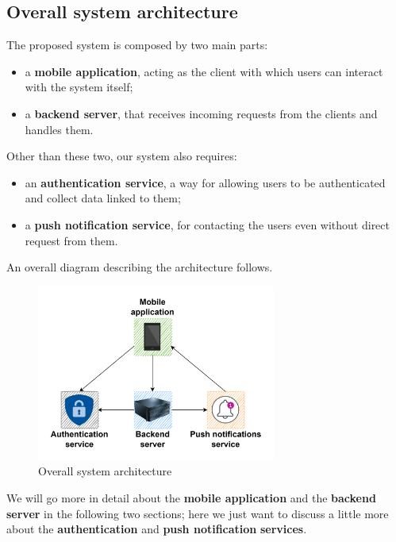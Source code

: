 \documentclass[../../main]{subfiles}
\begin{document}
\subsection{Overall system architecture}
\label{ss:overall-system-architecture}

The proposed system is composed by two main parts:
\begin{itemize}
    \item a \textbf{mobile application}, acting as the client with which users can interact with the system itself;
    \item a \textbf{backend server}, that receives incoming requests from the clients and handles them.
\end{itemize}
Other than these two, our system also requires:
\begin{itemize}
    \item an \textbf{authentication service}, a way for allowing users to be authenticated and collect data linked to them;
    \item a \textbf{push notification service}, for contacting the users even without direct request from them.
\end{itemize}
An overall diagram describing the architecture follows.
\begin{figure}[h]
    \centering
    \includegraphics[width=0.7\textwidth]{images/overall_system_architecture}
    \caption{Overall system architecture}\label{fig:overall_system_architecture}
\end{figure}

\noindent
We will go more in detail about the \textbf{mobile application} and the \textbf{backend server} in the following two sections; here we just want to discuss a little more about the \textbf{authentication} and \textbf{push notification} \textbf{services}.
\newpage
\end{document}
